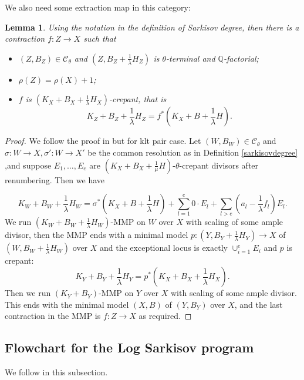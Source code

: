 \documentclass{article}
\newtheorem{lem}[defn]{Lemma}
\begin{document}
We also need some  extraction map in this category: 
\begin{lem}\label{thetaextraction}
Using the notation in the definition of Sarkisov degree, then there is a contraction  $f:Z\to X$ such that 
\begin{itemize}
  \item $(Z,B_{Z})\in \mathcal{C}_{\theta}$ and $(Z,B_{Z}+\frac{1}{\lambda}H_{Z})$ is $\theta$-terminal and $\mathbb{Q}$-factorial;
    \item  $\rho(Z)=\rho(X)+1$;
    \item $f$ is $(K_{X}+B_{X}+\frac{1}{\lambda}H_{X})$-crepant, that is 
      \[
        K_{Z}+B_{Z}+\frac{1}{\lambda}H_{Z}=f^*(K_{X}+B+\frac{1}{\lambda}H)
      .\] 
\end{itemize}
\end{lem}
\begin{proof}
  We follow the proof in \cite[Proposition 1.6]{brunoLogSarkisovProgram1995} but for klt pair case.  Let $(W,B_{W})\in \mathcal{C}_{\theta}$ and $\sigma:W\to X,\sigma':W \to X'$ be the common resolution as in Definition \ref{sarkisovdegree} ,and suppose  $E_{1},\ldots ,E_{e}$ are   $(K_{X}+B_{X}+\frac{1}{\mu}H)$-$\theta$-crepant divisors after renumbering. Then we have

\[ K_W+B_W+\frac{1}{\lambda} H_W=\sigma^*(K_X+B+\frac{1}{\lambda} H)+\sum_{l=1}^{e} 0\cdot E_{l}+\sum_{l>e}(a_l-\frac{1}{\lambda} f_l)E_l .\]
We run $(K_{W}+B_{W}+\frac{1}{\lambda}H_{W})$-MMP on $W$ over $X$ with scaling of some ample divisor, then the MMP ends with a minimal model $p:(Y,B_{Y}+\frac{1}{\lambda}H_{Y})\to X$  of $(W,B_{W}+\frac{1}{\lambda}H_{W})$ over $X$ and the exceptional locus is exactly $\cup_{i=1}^{e}E_{i}$ and $p$ is crepant: 
\[
 K_{Y}+B_{Y}+\frac{1}{\lambda}H_{Y}=p^*(K_{X}+B_{X}+\frac{1}{\lambda}H_{X}) 
.\]
Then we run $(K_{Y}+B_{Y})$-MMP on $Y$ over $X$ with scaling of some ample divisor. This ends with the minimal model  $(X,B)$ of $(Y,B_{Y})$ over $X$, and the last contraction  in the MMP is $f:Z\to X$  as required.
\end{proof}
\subsection{Flowchart for the Log Sarkisov program}
We follow \cite[Flowchart for the Sarkisov program]{brunoLogSarkisovProgram1995} in this subsection.
\end{document}
